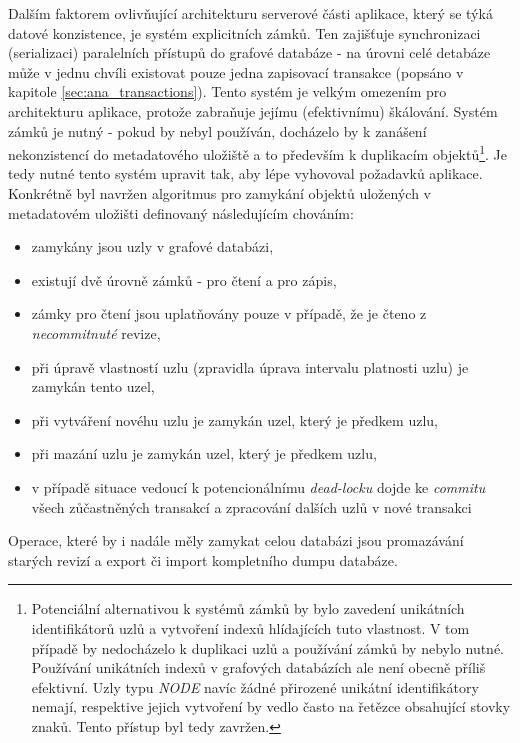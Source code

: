 Dalším faktorem ovlivňující architekturu serverové části aplikace, který se týká datové konzistence, je systém explicitních zámků. Ten zajišťuje synchronizaci (serializaci) paralelních přístupů do grafové databáze - na úrovni celé detabáze může v jednu chvíli existovat pouze jedna zapisovací transakce (popsáno v kapitole \ref{sec:ana_transactions}). Tento systém je velkým omezením pro architekturu aplikace, protože zabraňuje jejímu (efektivnímu) škálování. Systém zámků je nutný - pokud by nebyl používán, docházelo by k zanášení nekonzistencí do metadatového uložiště a to především k duplikacím objektů\footnote{Potenciální alternativou k systémů zámků by bylo zavedení unikátních identifikátorů uzlů a vytvoření indexů hlídajících tuto vlastnost. V tom případě by nedocházelo k duplikaci uzlů a používání zámků by nebylo nutné. Používání unikátních indexů v grafových databázích ale není obecně příliš efektivní. Uzly typu \textit{NODE} navíc žádné přirozené unikátní identifikátory nemají, respektive jejich vytvoření by vedlo často na řetězce obsahující stovky znaků. Tento přístup byl tedy zavržen.}. Je tedy nutné tento systém upravit tak, aby lépe vyhovoval požadavků aplikace. Konkrétně byl navržen algoritmus pro zamykání objektů uložených v metadatovém uložišti definovaný následujícím chováním:

\begin{itemize}
   \item zamykány jsou uzly v grafové databázi,
   \item existují dvě úrovně zámků - pro čtení a pro zápis,
   \item zámky pro čtení jsou uplatňovány pouze v případě, že je čteno z \textit{necommitnuté} revize,
   \item při úpravě vlastností uzlu (zpravidla úprava intervalu platnosti uzlu) je zamykán tento uzel,
   \item při vytváření novéhu uzlu je zamykán uzel, který je předkem uzlu,
   \item při mazání uzlu je zamykán uzel, který je předkem uzlu,
   \item v případě situace vedoucí k potencionálnímu \textit{dead-locku} dojde ke \textit{commitu} všech zůčastněných transakcí a zpracování dalších uzlů v nové transakci
\end{itemize}

Operace, které by i nadále měly zamykat celou databázi jsou promazávání starých revizí a export či import kompletního dumpu databáze.

